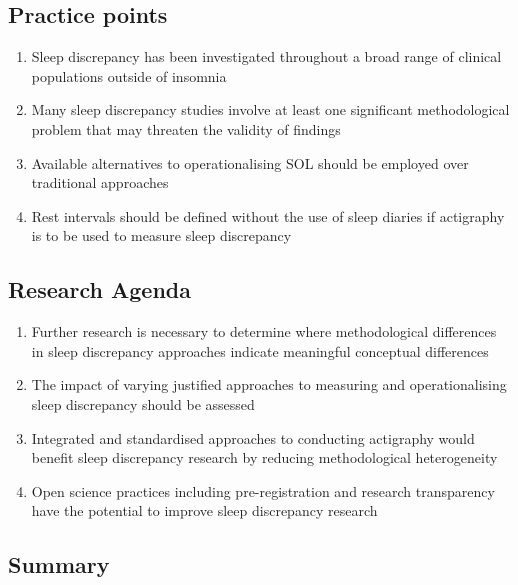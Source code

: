 \documentclass[
]{article}
\providecommand{\tightlist}{%
  \setlength{\itemsep}{0pt}\setlength{\parskip}{0pt}}
\begin{document}
\subsection{Practice points}\label{practice-points}

\begin{enumerate}
\def\labelenumi{\arabic{enumi}.}
\tightlist
\item
  Sleep discrepancy has been investigated throughout a broad range of clinical populations outside of insomnia
\item
  Many sleep discrepancy studies involve at least one significant methodological problem that may threaten the validity of findings
\item
  Available alternatives to operationalising SOL should be employed over traditional approaches
\item
  Rest intervals should be defined without the use of sleep diaries if actigraphy is to be used to measure sleep discrepancy
\end{enumerate}

\subsection{Research Agenda}\label{research-agenda}

\begin{enumerate}
\def\labelenumi{\arabic{enumi}.}
\tightlist
\item
  Further research is necessary to determine where methodological differences in sleep discrepancy approaches indicate meaningful conceptual differences
\item
  The impact of varying justified approaches to measuring and operationalising sleep discrepancy should be assessed
\item
  Integrated and standardised approaches to conducting actigraphy would benefit sleep discrepancy research by reducing methodological heterogeneity
\item
  Open science practices including pre-registration and research transparency have the potential to improve sleep discrepancy research
\end{enumerate}

\subsection{Summary}\label{item21}
\end{document}
